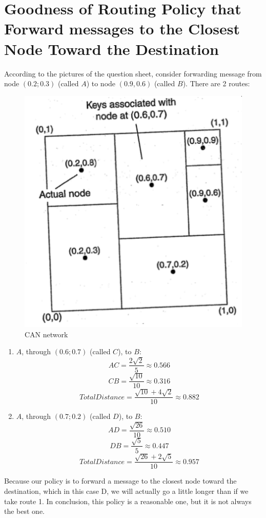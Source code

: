 \documentclass[11pt,a4paper]{report}
\begin{document}
	\section{Goodness of Routing Policy that Forward messages to the Closest Node Toward the Destination}
		According to the pictures of the question sheet, consider forwarding message from node $(0.2;0.3)$ (called $A$) to node $(0.9, 0.6)$ (called $B$). There are 2 routes:
		\newpage
		\begin{figure}[h!]
  			\includegraphics[width=\linewidth]{can-map.png}
  			\caption{CAN network}
  			\label{fig:CAN}
		\end{figure}
		\begin{enumerate}
			\item $A$, through $(0.6;0.7)$ (called $C$), to $B$:
				\[AC = \frac{2\sqrt{2}}{5} \approx 0.566\]
				\[CB = \frac{\sqrt{10}}{10} \approx 0.316\]
				\[TotalDistance = \frac{\sqrt{10} + 4\sqrt{2}}{10} \approx 0.882\]
			\item $A$, through $(0.7;0.2)$ (called $D$), to $B$:
				\[AD = \frac{\sqrt{26}}{10} \approx 0.510\]
				\[DB = \frac{\sqrt{5}}{5} \approx 0.447\]
				\[TotalDistance = \frac{\sqrt{26} + 2\sqrt{5}}{10} \approx 0.957\]
		\end{enumerate}		
		Because our policy is to forward a message to the closest
node toward the destination, which in this case D, we will actually go a little longer than if we take route 1. In conclusion, this policy is a reasonable one, but it is not always the best one.
\end{document}
